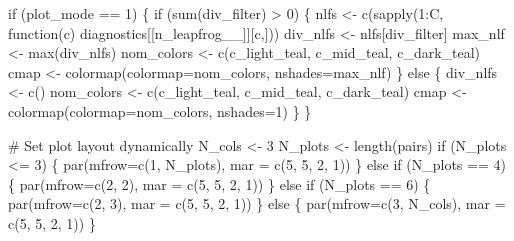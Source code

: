 \documentclass[
  letterpaper,
  DIV=11,
  numbers=noendperiod]{scrartcl}
\newenvironment{Shaded}{\begin{snugshade}}{\end{snugshade}}
\newcommand{\BuiltInTok}[1]{\textcolor[rgb]{0.00,0.23,0.31}{#1}}
\newcommand{\CommentTok}[1]{\textcolor[rgb]{0.37,0.37,0.37}{#1}}
\newcommand{\ControlFlowTok}[1]{\textcolor[rgb]{0.00,0.23,0.31}{#1}}
\newcommand{\DecValTok}[1]{\textcolor[rgb]{0.68,0.00,0.00}{#1}}
\newcommand{\NormalTok}[1]{\textcolor[rgb]{0.00,0.23,0.31}{#1}}
\newcommand{\OperatorTok}[1]{\textcolor[rgb]{0.37,0.37,0.37}{#1}}
\newcommand{\StringTok}[1]{\textcolor[rgb]{0.13,0.47,0.30}{#1}}
\begin{document}
\begin{Shaded}
\begin{Highlighting}[]
  \ControlFlowTok{if}\NormalTok{ (plot\_mode }\OperatorTok{==} \DecValTok{1}\NormalTok{) \{}
    \ControlFlowTok{if}\NormalTok{ (}\BuiltInTok{sum}\NormalTok{(div\_filter) }\OperatorTok{\textgreater{}} \DecValTok{0}\NormalTok{) \{}
\NormalTok{      nlfs }\OperatorTok{\textless{}{-}}\NormalTok{ c(sapply(}\DecValTok{1}\NormalTok{:C,}
\NormalTok{                       function(c) diagnostics[[}\StringTok{\textquotesingle{}n\_leapfrog\_\_\textquotesingle{}}\NormalTok{]][c,]))}
\NormalTok{      div\_nlfs }\OperatorTok{\textless{}{-}}\NormalTok{ nlfs[div\_filter]}
\NormalTok{      max\_nlf }\OperatorTok{\textless{}{-}} \BuiltInTok{max}\NormalTok{(div\_nlfs)}
\NormalTok{      nom\_colors }\OperatorTok{\textless{}{-}}\NormalTok{ c(c\_light\_teal, c\_mid\_teal, c\_dark\_teal)}
\NormalTok{      cmap }\OperatorTok{\textless{}{-}}\NormalTok{ colormap(colormap}\OperatorTok{=}\NormalTok{nom\_colors, nshades}\OperatorTok{=}\NormalTok{max\_nlf)}
\NormalTok{    \} }\ControlFlowTok{else}\NormalTok{ \{}
\NormalTok{      div\_nlfs }\OperatorTok{\textless{}{-}}\NormalTok{ c()}
\NormalTok{      nom\_colors }\OperatorTok{\textless{}{-}}\NormalTok{ c(c\_light\_teal, c\_mid\_teal, c\_dark\_teal)}
\NormalTok{      cmap }\OperatorTok{\textless{}{-}}\NormalTok{ colormap(colormap}\OperatorTok{=}\NormalTok{nom\_colors, nshades}\OperatorTok{=}\DecValTok{1}\NormalTok{)}
\NormalTok{    \}}
\NormalTok{  \}}

  \CommentTok{\# Set plot layout dynamically}
\NormalTok{  N\_cols }\OperatorTok{\textless{}{-}} \DecValTok{3}
\NormalTok{  N\_plots }\OperatorTok{\textless{}{-}}\NormalTok{ length(pairs)}
  \ControlFlowTok{if}\NormalTok{ (N\_plots }\OperatorTok{\textless{}=} \DecValTok{3}\NormalTok{) \{}
\NormalTok{    par(mfrow}\OperatorTok{=}\NormalTok{c(}\DecValTok{1}\NormalTok{, N\_plots), mar }\OperatorTok{=}\NormalTok{ c(}\DecValTok{5}\NormalTok{, }\DecValTok{5}\NormalTok{, }\DecValTok{2}\NormalTok{, }\DecValTok{1}\NormalTok{))}
\NormalTok{  \} }\ControlFlowTok{else} \ControlFlowTok{if}\NormalTok{ (N\_plots }\OperatorTok{==} \DecValTok{4}\NormalTok{) \{}
\NormalTok{    par(mfrow}\OperatorTok{=}\NormalTok{c(}\DecValTok{2}\NormalTok{, }\DecValTok{2}\NormalTok{), mar }\OperatorTok{=}\NormalTok{ c(}\DecValTok{5}\NormalTok{, }\DecValTok{5}\NormalTok{, }\DecValTok{2}\NormalTok{, }\DecValTok{1}\NormalTok{))}
\NormalTok{  \} }\ControlFlowTok{else} \ControlFlowTok{if}\NormalTok{ (N\_plots }\OperatorTok{==} \DecValTok{6}\NormalTok{) \{}
\NormalTok{    par(mfrow}\OperatorTok{=}\NormalTok{c(}\DecValTok{2}\NormalTok{, }\DecValTok{3}\NormalTok{), mar }\OperatorTok{=}\NormalTok{ c(}\DecValTok{5}\NormalTok{, }\DecValTok{5}\NormalTok{, }\DecValTok{2}\NormalTok{, }\DecValTok{1}\NormalTok{))}
\NormalTok{  \} }\ControlFlowTok{else}\NormalTok{ \{}
\NormalTok{    par(mfrow}\OperatorTok{=}\NormalTok{c(}\DecValTok{3}\NormalTok{, N\_cols), mar }\OperatorTok{=}\NormalTok{ c(}\DecValTok{5}\NormalTok{, }\DecValTok{5}\NormalTok{, }\DecValTok{2}\NormalTok{, }\DecValTok{1}\NormalTok{))}
\NormalTok{  \}}
  

\end{Highlighting}
\end{Shaded}
\end{document}
